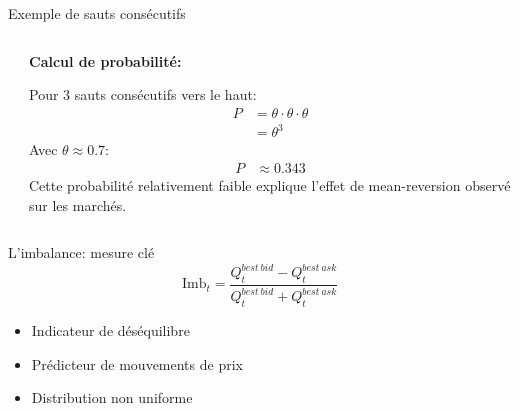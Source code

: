 \documentclass[aspectratio=169]{beamer}  %
\begin{document}
\begin{frame}{Exemple de sauts consécutifs}
\begin{columns}
\begin{column}{0.6\textwidth}
        \end{column}
        \begin{column}{0.4\textwidth}
            \textbf{Calcul de probabilité:}
            \vspace{0.3cm}
            
            Pour 3 sauts consécutifs vers le haut:
            \begin{align*}
                P &= \theta \cdot \theta \cdot \theta \\
                &= \theta^3
            \end{align*}
            \vspace{0.2cm}
            Avec $\theta \approx 0.7$:
            \begin{align*}
                P &\approx 0.343
            \end{align*}
            \vspace{0.2cm}
            Cette probabilité relativement faible explique l'effet de mean-reversion observé sur les marchés.
        \end{column}
    \end{columns}
\end{frame}

\begin{frame}{L'imbalance: mesure clé}
    \begin{equation*}
        \text{Imb}_t = \frac{Q^{best\ bid}_t-Q^{best\ ask}_t}{Q^{best\ bid}_t+Q^{best\ ask}_t}
    \end{equation*}
    \begin{itemize}
        \item Indicateur de déséquilibre
        \item Prédicteur de mouvements de prix
        \item Distribution non uniforme
    \end{itemize}
\end{frame}
\end{document}
